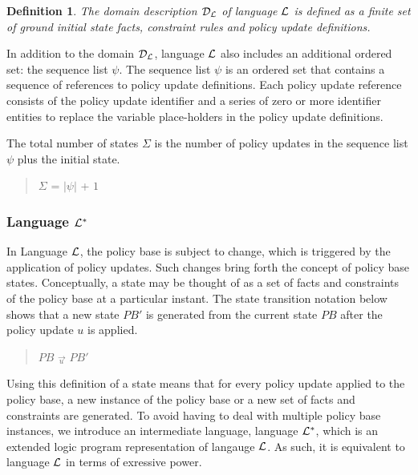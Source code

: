 \documentclass[10pt, twocolumn]{article}
\newtheorem{definition}{Definition}
\begin{document}
        \begin{definition}
          The domain description ${\cal D}_{\cal L}$ of language ${\cal L}$ is
          defined as a finite set of ground initial state facts, constraint
          rules and policy update definitions.
        \end{definition}

        In addition to the domain ${\cal D}_{\cal L}$, language ${\cal L}$
        also includes an additional ordered set: the sequence list $\psi$.
        The sequence list $\psi$ is an ordered set that contains a sequence of
        references to policy update definitions. Each policy update reference
        consists of the policy update identifier and a series of zero or more
        identifier entities to replace the variable place-holders in the policy
        update definitions.

        The total number of states $\Sigma$ is the number of policy updates in
        the sequence list $\psi$ plus the initial state.

        \begin{quote}
          $\Sigma$ = $|\psi|$ + $1$
        \end{quote}

      \subsubsection{Language ${\cal L}^{*}$}

        In Language ${\cal L}$, the policy base is subject to change, which is
        triggered by the application of policy updates. Such changes bring
        forth the concept of policy base states. Conceptually, a state may be
        thought of as a set of facts and constraints of the policy base at a
        particular instant. The state transition notation below shows that a
        new state $PB'$ is generated from the current state $PB$ after the
        policy update $u$ is applied.
  
        \begin{quote}
          $PB$ $\overrightarrow{_{u}}$ $PB'$
        \end{quote}

        Using this definition of a state means that for every policy update
        applied to the policy base, a new instance of the policy base or a new
        set of facts and constraints are generated. To avoid having to deal
        with multiple policy base instances, we introduce an intermediate
        language, language ${\cal L}^{*}$, which is an extended logic program
        representation of langauge ${\cal L}$. As such, it is equivalent to
        language ${\cal L}$ in terms of exressive power.
\end{document}
